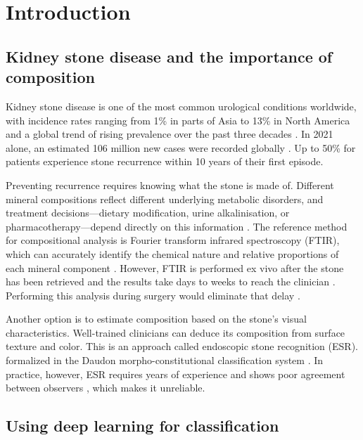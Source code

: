 \documentclass[10pt,twocolumn]{article}
\begin{document}
\section*{Introduction}

\subsection*{Kidney stone disease and the importance of composition}

Kidney stone disease is one of the most common urological conditions worldwide, with incidence rates ranging from 1\% in parts of Asia to 13\% in North America and a global trend of rising prevalence over the past three decades \cite{Türk2022, Qian2022, Sorokin2017, Stamatelou2023}. In 2021 alone, an estimated 106 million new cases were recorded globally \cite{Qian2022}. Up to 50\% for patients experience stone recurrence within 10 years of their first episode.

Preventing recurrence requires knowing what the stone is made of. Different mineral compositions reflect different underlying metabolic disorders, and treatment decisions---dietary modification, urine alkalinisation, or pharmacotherapy---depend directly on this information \cite{Daudon2016, Corrales2021}. The reference method for compositional analysis is Fourier transform infrared spectroscopy (FTIR), which can accurately identify the chemical nature and relative proportions of each mineral component \cite{Basiri2025, Daudon2016}. However, FTIR is performed ex vivo after the stone has been retrieved and the results take days to weeks to reach the clinician \cite{Daudon2014}. Performing this analysis during surgery would eliminate that delay \cite{Zhu2024, Leng2024}.

Another option is to estimate composition based on the stone’s visual characteristics. Well-trained clinicians can deduce its composition from surface texture and color. This is an approach called endoscopic stone recognition (ESR). formalized in the Daudon morpho-constitutional classification system \cite{Daudon2016, Corrales2021}. In practice, however, ESR requires years of experience and shows poor agreement between observers \cite{Randall2023}, which makes it unreliable.

\subsection*{Using deep learning for classification}
\end{document}
